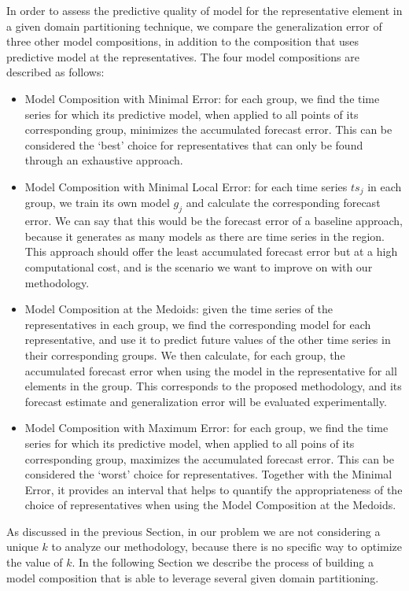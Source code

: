 In order to assess the predictive quality of model for the representative element in a given domain partitioning  technique, we compare the generalization error of three other model compositions, in addition to the composition that uses predictive model at the representatives. The four model compositions are described as follows: 

\begin{itemize}%
	\item Model Composition with Minimal Error: for each group, we find the time series for which its predictive model, when applied to all points of its corresponding group, minimizes the accumulated forecast error. This can be considered the `best' choice for representatives that can only be found through an exhaustive approach.
	\item Model Composition with Minimal Local Error: for each time series $ts_j$ in each group, we train its own model $g_j$ and calculate the corresponding forecast error. We can say that this would be the forecast error of a baseline approach, because it generates as many models as there are time series in the region. This approach should offer the least accumulated forecast error but at a high computational cost, and is the scenario we want to improve on with our methodology.
	\item Model Composition at the Medoids: given the time series of the representatives in each group, we find the corresponding model for each representative, and use it to predict future values of the other time series in their corresponding groups. We then calculate, for each group, the accumulated forecast error when using the model in the representative for all elements in the group. This corresponds to the proposed methodology, and its forecast estimate and generalization error will be evaluated experimentally.
	\item Model Composition with Maximum Error: for each group, we find the time series for which its predictive model, when applied to all poins of its corresponding group, maximizes the accumulated forecast error. This can be considered the `worst' choice for representatives. Together with the Minimal Error, it provides an interval that helps to quantify the appropriateness of the choice of representatives when using the Model Composition at the Medoids.
\end{itemize}

As discussed in the previous Section, in our problem we are not considering a unique $k$ to analyze our methodology, because there is no specific way to optimize the value of $k$. In the following Section we describe the process of building a model composition that is able to leverage several given domain partitioning.

